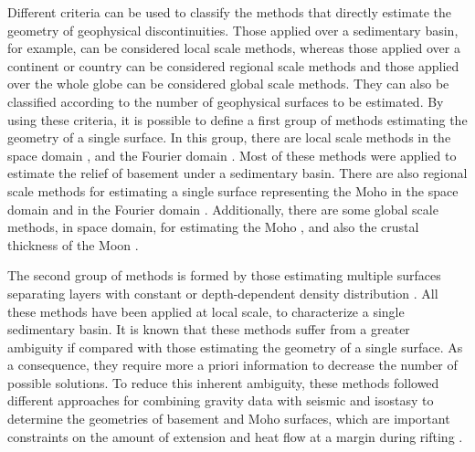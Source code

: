 \documentclass[manuscript]{geophysics}
\begin{document}
Different criteria can be used to classify the methods that directly estimate
the geometry of geophysical discontinuities.
Those applied over a sedimentary basin, for example, can be considered local scale methods,
whereas those applied over a continent or country can be considered regional scale methods
and those applied over the whole globe can be considered global scale methods.
They can also be classified according to the number of geophysical surfaces
to be estimated.
By using these criteria, it is possible to define a first group of methods
estimating the geometry of a single surface.
In this group, there are local scale methods in the space domain
\citep[e.g.,][]{bott1960, tanner1967, cordell-henderson1968, dyrelius-vogel1972, 
pedersen1977, richardson-macinnes1989, barbosa-etal1997, condi-etal1999, 
barbosa-etal1999, barbosa-etal1999b, silva-etal2006,  
chakravarthi-sundararajan2007, martins-etal2010, silva-etal2010, lima-etal2011, 
martins-etal2011, barnes-barraud2012, silva-etal2014, silva-santos2017},
and the Fourier domain
\citep[e.g.,][]{oldenburg1974, granser1987, reamer-ferguson1989, guspi1993}.
Most of these methods were applied to estimate the relief of basement under
a sedimentary basin.
There are also regional scale methods for estimating a single surface 
representing the Moho in the space domain 
\citep[e.g.,][]{shin-etal2009, bagherbandi-eshagh2012, barzaghi-biagi2014, 
sampietro2015, uieda-barbosa2017} and in the Fourier domain 
\citep[e.g.,][]{braitenberg-etal1997, braitenberg-zadro1999, vandermeijde-etal2013}.
Additionally, there are some global scale methods, in space domain, for estimating the Moho
\citep[e.g.,][]{sunkel1985, sjoberg2009}, 
and also the crustal thickness of the Moon \citep{zhang-etal2019}.

The second group of methods is formed by those estimating multiple surfaces
separating layers with constant or depth-dependent density distribution 
\citep[e.g.,][]{condi-etal1999, camacho-etal2011, salem-etal2014, 
ferderer-etal2017, garcia-abdeslem2017, salem2017}.
All these methods have been applied at local scale, to characterize a single 
sedimentary basin.
It is known that these methods suffer from a greater ambiguity if compared with 
those estimating the geometry of a single surface.
As a consequence, they require more a priori information to
decrease the number of possible solutions. 
To reduce this inherent ambiguity, these methods followed different approaches
for combining gravity data with seismic and isostasy 
to determine the geometries of basement and Moho surfaces, which are important 
constraints on the amount of extension and heat flow at a margin during rifting
\citep{watts-fairhead1999}.
\end{document}
